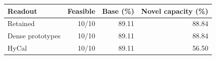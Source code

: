 \begin{tabular}{@{}lrrr@{}}
\toprule
Readout & Feasible & Base (\%) & Novel capacity (\%) \\
\midrule
Retained & 10/10 & 89.11 & 88.84 \\
Dense prototypes & 10/10 & 89.11 & 88.84 \\
HyCal & 10/10 & 89.11 & 56.50 \\
\bottomrule
\end{tabular}
